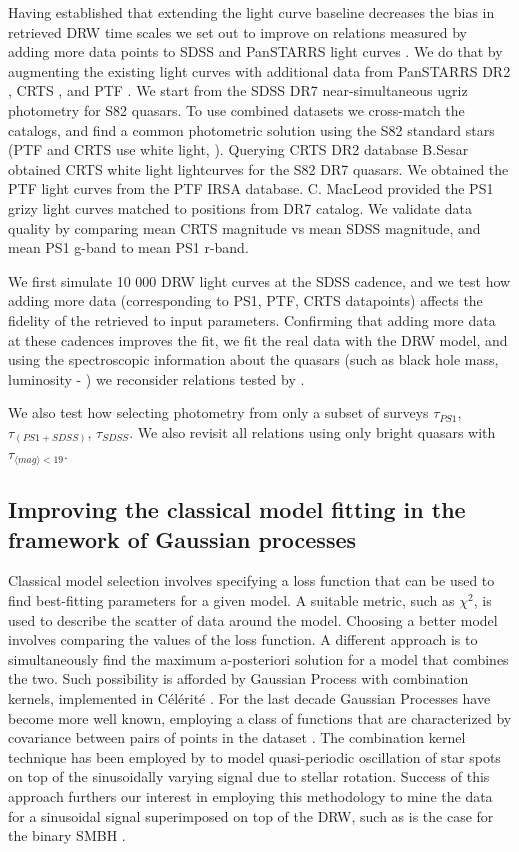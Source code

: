 \documentclass[modern]{aastex62}
\begin{document}
Having established that extending the light curve baseline decreases the bias in retrieved DRW time scales we set out to improve on relations measured by \cite{macleod2011, hernitschek2016} adding more data points to SDSS and PanSTARRS light curves \citep{chambers2011}. We do that by augmenting the existing light curves with additional data from PanSTARRS DR2 \citep{flewelling2018} , CRTS \citep{drake2009}, and PTF \citep{rau2009}.  We start from the SDSS  DR7 near-simultaneous ugriz photometry for S82 quasars\citep{schneider2008}.  To use combined datasets we cross-match the catalogs, and find a common photometric solution using the S82 standard stars (PTF and CRTS use white light, \cite{djorgovski2011a}). Querying CRTS DR2 database B.Sesar obtained CRTS white light lightcurves for the S82 DR7 quasars.  We obtained the PTF light curves from the PTF IRSA database.  C. MacLeod provided  the PS1  grizy  light curves matched to positions from DR7 catalog.  We validate data quality by comparing mean CRTS magnitude vs mean SDSS magnitude, and mean PS1 g-band to mean PS1 r-band. 

We first simulate 10 000 DRW light curves at the SDSS cadence, and we test how adding more data (corresponding to PS1, PTF, CRTS datapoints) affects the fidelity of the retrieved to input parameters. Confirming that adding more data at these cadences improves the fit, we fit the real data with the DRW model, and using the spectroscopic information about the quasars (such as black hole mass, luminosity - \cite{kelly2013}) we reconsider relations tested by \cite{macleod2011}. 

We also test how selecting photometry from only a subset of surveys $\tau_{PS1}$, $\tau_{(PS1+SDSS)}$,  $\tau_{SDSS}$.  We also revisit all relations using only bright quasars with   $\tau_{\langle mag\rangle<19}$.

\subsection{Improving the classical model fitting in the  framework of Gaussian processes}

Classical model selection involves specifying a loss function that can be used to find best-fitting parameters for a given model. A suitable metric, such as $\chi^{2}$, is used to  describe the scatter of data around the model. Choosing a better model involves comparing the values of the loss function. A different approach is to simultaneously find the maximum a-posteriori solution for a model that combines the two. Such possibility is afforded by Gaussian Process with combination kernels,  implemented in C\'el\'erit\'e  \citep{foreman2017}. For the last decade Gaussian Processes have become more well known, employing a class of functions that  are characterized by covariance between pairs of points in the dataset \citep{foreman2017}.  The combination kernel technique has been employed by  \cite{angus2018}  to model  quasi-periodic oscillation of star spots on top of the sinusoidally varying signal due to stellar rotation. Success of this approach furthers our interest in employing this methodology to mine the data for a sinusoidal signal superimposed on top of the DRW, such as is the case for the binary SMBH \citep{charisi2018}. 
\end{document}
